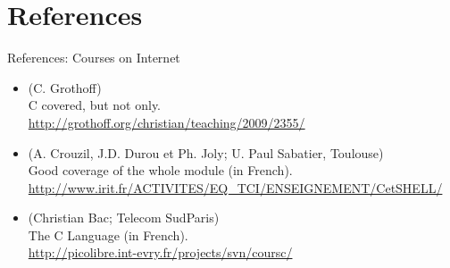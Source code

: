 \section{References}
\begin{frame}{References: Courses on Internet}
    \begin{itemize}
    \item {} (C. Grothoff)\\
         {\small
      C covered, but not only.\\
      \url{http://grothoff.org/christian/teaching/2009/2355/}} 
      
    \item {} (A. Crouzil, J.D. Durou et Ph. Joly;
      U. Paul Sabatier, Toulouse)\\
      {\small 
        Good coverage of the whole module (in French).\\
        \url{http://www.irit.fr/ACTIVITES/EQ_TCI/ENSEIGNEMENT/CetSHELL/}}

    \item {} (Christian Bac; Telecom SudParis)\\
      {\small
        The C Language (in French).\\
        \url{http://picolibre.int-evry.fr/projects/svn/coursc/}}
    \end{itemize}
\end{frame}
